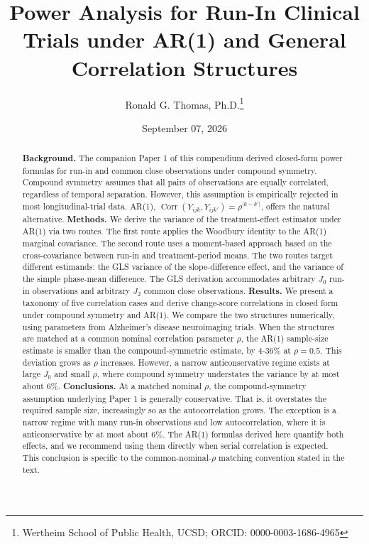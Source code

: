 \documentclass[
  11pt,
]{article}
\title{Power Analysis for Run-In Clinical Trials under
AR(1) and General Correlation Structures}
\author{Ronald G. Thomas, Ph.D.\thanks{Wertheim School of Public Health, UCSD; ORCID: 0000-0003-1686-4965}}
\date{September 07, 2026}
\DeclareMathOperator{\Corr}{Corr}
\begin{document}
\maketitle
\begin{abstract}
\textbf{Background.} The companion Paper 1 of this compendium
derived closed-form power formulas for run-in and common
close observations under compound symmetry. Compound
symmetry assumes that all pairs of observations are equally
correlated, regardless of temporal separation. However, this
assumption is empirically rejected in most longitudinal-trial
data. AR(1), \(\Corr(Y_{ijk}, Y_{ijk'}) = \rho^{|k-k'|}\),
offers the natural alternative.
\textbf{Methods.} We derive the variance of the treatment-effect
estimator under AR(1) via two routes. The first route applies
the Woodbury identity to the AR(1) marginal covariance. The
second route uses a moment-based approach based on the
cross-covariance between run-in and treatment-period means.
The two routes target different estimands: the GLS variance
of the slope-difference effect, and the variance of the
simple phase-mean difference. The GLS derivation accommodates
arbitrary \(J_0\) run-in observations and arbitrary \(J_2\)
common close observations.
\textbf{Results.} We present a taxonomy of five correlation cases
and derive change-score correlations in closed form under
compound symmetry and AR(1). We compare the two structures
numerically, using parameters from Alzheimer's disease
neuroimaging trials. When the structures are matched at a
common nominal correlation parameter \(\rho\), the AR(1)
sample-size estimate is smaller than the compound-symmetric
estimate, by 4-36\% at \(\rho = 0.5\). This deviation grows as
\(\rho\) increases. However, a narrow anticonservative regime
exists at large \(J_0\) and small \(\rho\), where compound
symmetry understates the variance by at most about 6\%.
\textbf{Conclusions.} At a matched nominal \(\rho\), the
compound-symmetry assumption underlying Paper 1 is generally
conservative. That is, it overstates the required sample
size, increasingly so as the autocorrelation grows. The
exception is a narrow regime with many run-in observations
and low autocorrelation, where it is anticonservative by at
most about 6\%. The AR(1) formulas derived here quantify both
effects, and we recommend using them directly when serial
correlation is expected. This conclusion is specific to the
common-nominal-\(\rho\) matching convention stated in the
text.
\end{abstract}

{
\setcounter{tocdepth}{2}
\tableofcontents
}
\end{document}
